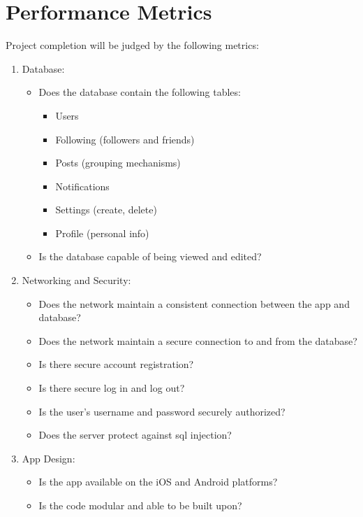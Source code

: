 \documentclass[letterpaper, 10, draftclsnofoot, onecolumn]{IEEEtran}
\begin{document}
\section*{Performance Metrics}\par
\hspace{4ex}Project completion will be judged by the following metrics:
\begin{enumerate}
\item Database:
\begin{itemize}
\item Does the database contain the following tables: 
	\begin{itemize} 
        \item Users
		\item Following (followers and friends)
        \item Posts (grouping mechanisms)
        \item Notifications
        \item Settings (create, delete)
        \item Profile (personal info)
	\end{itemize}
\item Is the database capable of being viewed and edited?
\end{itemize}
\item Networking and Security:
\begin{itemize}
\item Does the network maintain a consistent connection between the app and database?
\item Does the network maintain a secure connection to and from the database?
\item Is there secure account registration?
\item Is there secure log in and log out?
\item Is the user's username and password securely authorized?
\item Does the server protect against sql injection?
\end{itemize}

\item App Design:
\begin{itemize}
\item Is the app available on the iOS and Android platforms?
\item Is the code modular and able to be built upon?
\end{itemize}


\end{enumerate}
\end{document}
